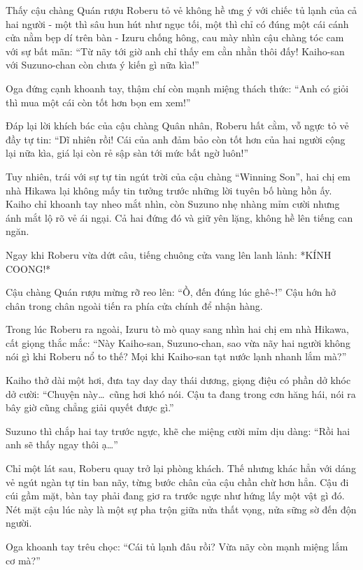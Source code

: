 \documentclass[../main.tex]{subfiles}
\begin{document}
\ct

Thấy cậu chàng Quán rượu Roberu tỏ vẻ không hề ưng ý với chiếc tủ lạnh của cả hai người - một thì sâu hun hút như ngục tối, một thì chỉ có đúng một cái cánh cửa nằm bẹp dí trên bàn - Izuru chống hông, cau mày nhìn cậu chàng tóc cam với sự bất mãn: ``Từ nãy tới giờ anh chỉ thấy em cằn nhằn thôi đấy! Kaiho-san với Suzuno-chan còn chưa ý kiến gì nữa kìa!''

Oga đứng cạnh khoanh tay, thậm chí còn mạnh miệng thách thức: ``Anh có giỏi thì mua một cái còn tốt hơn bọn em xem!''

Đáp lại lời khích bác của cậu chàng Quân nhân, Roberu hất cằm, vỗ ngực tỏ vẻ đầy tự tin: ``Dĩ nhiên rồi! Cái của anh đảm bảo còn tốt hơn của hai người cộng lại nữa kìa, giá lại còn rẻ sập sàn tới mức bất ngờ luôn!''

Tuy nhiên, trái với sự tự tin ngút trời của cậu chàng ``Winning Son'', hai chị em nhà Hikawa lại không mấy tin tưởng trước những lời tuyên bố hùng hồn ấy. Kaiho chỉ khoanh tay nheo mắt nhìn, còn Suzuno nhẹ nhàng mỉm cười nhưng ánh mắt lộ rõ vẻ ái ngại. Cả hai đứng đó và giữ yên lặng, không hề lên tiếng can ngăn.

Ngay khi Roberu vừa dứt câu, tiếng chuông cửa vang lên lanh lảnh: *KÍNH COONG!*

Cậu chàng Quán rượu mừng rỡ reo lên: ``Ồ, đến đúng lúc ghê\~{}!'' Cậu hớn hở chân trong chân ngoài tiến ra phía cửa chính để nhận hàng.

Trong lúc Roberu ra ngoài, Izuru tò mò quay sang nhìn hai chị em nhà Hikawa, cất giọng thắc mắc: ``Này Kaiho-san, Suzuno-chan, sao vừa nãy hai người không nói gì khi Roberu nổ to thế? Mọi khi Kaiho-san tạt nước lạnh nhanh lắm mà?''

Kaiho thở dài một hơi, đưa tay day day thái dương, giọng điệu có phần dở khóc dở cười: ``Chuyện này\dots\ cũng hơi khó nói. Cậu ta đang trong cơn hăng hái, nói ra bây giờ cũng chẳng giải quyết được gì.''

Suzuno thì chắp hai tay trước ngực, khẽ che miệng cười mỉm dịu dàng: ``Rồi hai anh sẽ thấy ngay thôi ạ\dots''

Chỉ một lát sau, Roberu quay trở lại phòng khách. Thế nhưng khác hẳn với dáng vẻ ngút ngàn tự tin ban nãy, từng bước chân của cậu chần chừ hơn hẳn. Cậu đi cúi gầm mặt, bàn tay phải đang giơ ra trước ngực như hứng lấy một vật gì đó. Nét mặt cậu lúc này là một sự pha trộn giữa nửa thất vọng, nửa sững sờ đến độn người.

Oga khoanh tay trêu chọc: ``Cái tủ lạnh đâu rồi? Vừa nãy còn mạnh miệng lắm cơ mà?''
\end{document}
